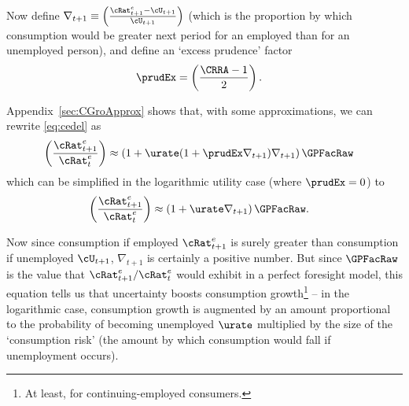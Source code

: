 \documentclass{handout}
\begin{document}


Now define $\nabla _{t+1} \equiv
\left(\frac{{\cRat}^{e}_{t+1}-\cU_{t+1}}{\cU_{t+1}}\right)$ (which is
the proportion by which consumption would
be greater next period for an employed than for an 
unemployed person), and define an `excess prudence' factor
\begin{equation}\begin{gathered}\begin{aligned}
  \prudEx & =  \left(\frac{\CRRA-1}{2}\right).
\end{aligned}\end{gathered}\end{equation}

Appendix~\ref{sec:CGroApprox} shows that, with some approximations, we can rewrite \eqref{eq:cedel} as
\begin{equation}\begin{gathered}\begin{aligned}
         \left(\frac{{\cRat}^{e}_{t+1}}{{\cRat}^{e}_{t}}\right) & \approx  \left(1+ \urate (1+\prudEx\nabla _{t+1})\nabla _{t+1}\right) {\GPFacRaw}
         \label{eq:cedelapprox}
\end{aligned}\end{gathered}\end{equation}
which can be simplified in the logarithmic utility case (where $\prudEx = 0$) to
\begin{equation}\begin{gathered}\begin{aligned}
         \left(\frac{{\cRat}^{e}_{t+1}}{{\cRat}^{e}_{t}}\right) & \approx  \left(1+ \urate \nabla _{t+1}\right) {\GPFacRaw} \label{eq:cedelapproxLog}. 
\end{aligned}\end{gathered}\end{equation}

Now since consumption if employed ${\cRat}^{e}_{t+1}$ is surely greater than
consumption if unemployed $\cU_{t+1}$, $\nabla _{t+1}$ is
certainly a positive number.  But since ${\GPFacRaw}$ is the
value that ${\cRat}^{e}_{t+1}/{\cRat}^{e}_{t}$ would exhibit in a perfect
foresight model, this equation tells us that uncertainty boosts
consumption growth\footnote{At least, for continuing-employed consumers.} -- in the logarithmic
case, consumption growth is augmented by an amount
proportional to the probability of becoming unemployed $\urate$ multiplied
by the size of the `consumption risk' (the amount by which consumption
would fall if unemployment occurs).
\end{document}
